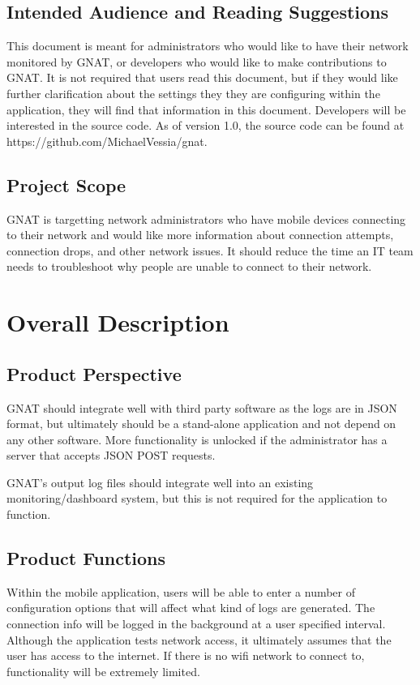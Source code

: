 \documentclass{scrreprt}
\def\version{1.0}
\def\sourcecode{https://github.com/MichaelVessia/gnat}
\begin{document}
\section{Intended Audience and Reading Suggestions}
This document is meant for administrators who would like to have their network monitored by GNAT, or developers who would like to make contributions to GNAT\@. It is not required that users read this document, but if they would like further clarification about the settings they they are configuring within the application, they will find that information in this document.  Developers will be interested in the source code. As of version \version, the source code can be found at \sourcecode.

\section{Project Scope}

GNAT is targetting network administrators who have mobile devices connecting to their network and would like more information about connection attempts, connection drops, and other network issues. It should reduce the time an IT team needs to troubleshoot why people are unable to connect to their network.

\chapter{Overall Description}

\section{Product Perspective}

GNAT should integrate well with third party software as the logs are in JSON format, but ultimately should be a stand-alone application and not depend on any other software. More functionality is unlocked if the administrator has a server that accepts JSON POST requests.

GNAT's output log files should integrate well into an existing monitoring/dashboard system, but this is not required for the application to function.


\section{Product Functions}


Within the mobile application, users will be able to enter a number of configuration options that will affect what kind of logs are generated. The connection info will be logged in the background at a user specified interval. Although the application tests network access, it ultimately assumes that the user has access to the internet.  If there is no wifi network to connect to, functionality will be extremely limited.
\end{document}
